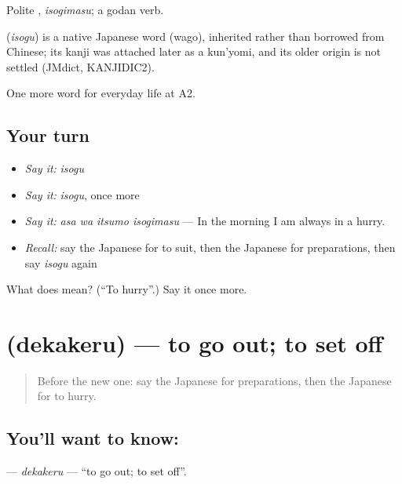 Polite \textbf{}, \emph{isogimasu}; a godan verb.

\begin{cousinweb}
\textbf{} (\emph{isogu}) is a native Japanese word (wago), inherited rather than borrowed from Chinese; its kanji was attached later as a kun'yomi, and its older origin is not settled (JMdict, KANJIDIC2).
\end{cousinweb}

\begin{grammarlens}[title={What you've built}]
One more word for everyday life at A2.
\end{grammarlens}

\subsection*{Your turn}
\begin{itemize}
\raggedright
  \item \emph{Say it:} \emph{isogu}
  \item \emph{Say it:} \emph{isogu}, once more
  \item \emph{Say it:} \emph{asa wa itsumo isogimasu} — In the morning I am always in a hurry.
  \item \emph{Recall:} say the Japanese for to suit, then the Japanese for preparations, then say \emph{isogu} again
\end{itemize}

\begin{tcolorbox}[breakable,colback=teal!4,colframe=teal!35!black,title={Before you move on}]
What does  mean? (\textquotedblleft{}To hurry\textquotedblright{}.) Say it once more.
\end{tcolorbox}
\section[\texorpdfstring{\ja{でかける} (dekakeru)}{でかける (dekakeru)}]{ (dekakeru) — to go out; to set off}

\label{lesson:JA-C152-dekakeru}



\begin{quote}
Before the new one: say the Japanese for preparations, then the Japanese for to hurry.
\end{quote}

\subsection*{You'll want to know: }
\textbf{} — \emph{dekakeru} — \textquotedblleft{}to go out; to set off\textquotedblright{}.

